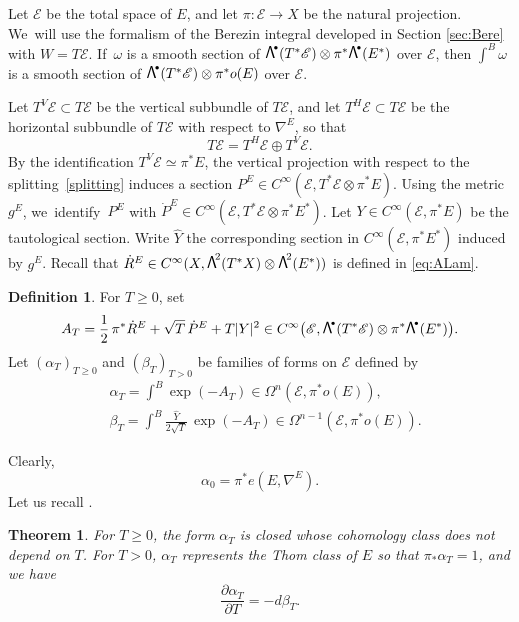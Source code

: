 \documentclass[JEP,XML,SOM,Unicode]{cedram}
\newcommand{\sbullet}{{\scriptscriptstyle\bullet}}
\newcommand\bw[1]{{\hbox{\large$\mathsf{\Lambda}$}^{\!#1}}}
\let\mathcal\mathscr
\theoremstyle{plain}
\newtheorem{thm}[lem]{Theorem}
\theoremstyle{definition}
\newtheorem{defin}[lem]{Definition}
\theoremstyle{remark}
\newcommand{\cE}{\mathcal{E}}
\let\p\partial
\let\g\geqslant
\begin{document}
Let $\cE$ be the total space of $E$, and let $\pi: \cE\to X$ be the
natural projection. We~will use the formalism of the Berezin integral developed in
Section \ref{sec:Bere} with $W = T\cE$. If~$\omega$ is a smooth section of
$\bw{\sbullet}(T^{*}\cE)\otimes\pi^{*}\bw{\sbullet}(E^{*})$
over $\cE$, then $\int^{B}\omega$ is a smooth section of $\bw{\sbullet}
(T^{*} \cE)
\otimes \pi^{*}o(E)$ over $\cE$.

Let $T^{V}\cE\subset T\cE$ be the vertical subbundle of $T\cE$, and
let $T^{H}\cE\subset T\cE$ be the horizontal subbundle of $T\cE$
with respect to $\nabla^{E}$, so that
\begin{equation}\label{splitting}
T\cE=T^{H}\cE\oplus T^{V}\cE.
\end{equation}
By the identification
$T^{V}\cE\simeq \pi^{*}E$,
the
vertical projection with
respect to the splitting~\eqref{splitting} induces a section
$P^{E}\in C^{\infty}(\cE,T^{*}\cE \otimes \pi^{*}E)$. Using the metric $g^{E}$, we~iden\-tify~$P^{E}$ with $\dot{P}^{E}\in C^{\infty}(\cE,T^{*}\cE \otimes \pi^{*}E^{*})$.
Let $Y\in C^{\infty}(\cE,\pi^{*}E)$ be the tautological section.
Write $\widehat{Y}$ the corresponding section in
$C^{\infty}(\cE,\pi^{*}E^{*})$ induced by $g^{E}$.
Recall that $\dot{R}^{E}\in C^{\infty}(X,\bw{2}(T^{*}X)\otimes \bw{2}(E^{*}))$ is
defined in \eqref{eq:ALam}.

\begin{defin}
For
$T\g 0$, set
\begin{equation*}
A_{T}=\frac{1}{2}\,\pi^{*}\dot{R}^{E}+\sqrt{T}\,\dot{P}^{E}+T|Y|^{2}\in C^{\infty}\big(\cE,\bw{\sbullet}(T^{*}\cE)\otimes \pi^{*}\bw{\sbullet}(E^{*})\big).
\end{equation*}
Let $(\alpha_{T})_{T\g0}$ and $(\beta_{T})_{T>0}$ be families of forms on $\cE$ defined
by
\begin{equation}\label{eqDang1}
\begin{aligned}
&\alpha_{T}=\int^{B}\exp(-A_{T})\in
\Omega^{n}(\cE,\pi^{*}o(E)),\\
&\beta_{T}=\int^{B}\frac{\widehat{Y}}{2\sqrt{T}}\,\exp(-A_{T})\in \Omega^{n-1}(\cE,\pi^{*}o(E)).
\end{aligned}
\end{equation}
\end{defin}
Clearly,
\begin{equation*}
\alpha_{0}=\pi^{*}e(E,\nabla^{E}).
\end{equation*}
Let us recall \cite[Th.\,3.4, 3.5, \& 3.7]{BZ92}.
\begin{thm}
For $T\g 0$, the form $\alpha_{T}$ is closed whose cohomology class
does not depend on $T$.
For $T>0$, $\alpha_{T}$ represents the Thom
class of $E$ so that $\pi_{*}\alpha_{T}=1$, and we have
\begin{equation*}
\frac{\p \alpha_{T}}{\p T}=-d\beta_{T}.
\end{equation*}
\end{thm}
\end{document}
